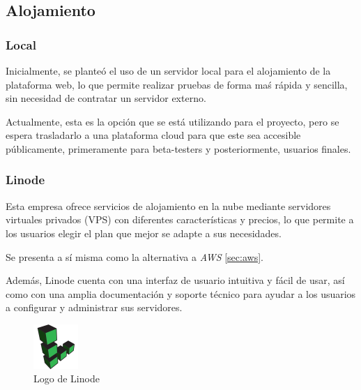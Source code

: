         \subsection{Alojamiento}

            \subsubsection{Local}

                Inicialmente, se planteó el uso de un servidor local para el alojamiento de la plataforma web, lo que permite realizar pruebas de forma maś rápida y sencilla, sin necesidad de contratar un servidor externo.

                Actualmente, esta es la opción que se está utilizando para el proyecto, pero se espera trasladarlo a una plataforma cloud para que este sea accesible públicamente, primeramente para beta-testers y posteriormente, usuarios finales.
                
            \subsubsection{Linode}

                Esta empresa ofrece servicios de alojamiento en la nube mediante servidores virtuales privados (VPS) con diferentes características y precios, lo que permite a los usuarios elegir el plan que mejor se adapte a sus necesidades.

                Se presenta a sí misma como la alternativa a \textit{AWS} \ref{sec:aws}.

                Además, Linode cuenta con una interfaz de usuario intuitiva y fácil de usar, así como con una amplia documentación y soporte técnico para ayudar a los usuarios a configurar y administrar sus servidores.

                \begin{figure}[htbp]
                    \centering

                    \includegraphics[width=0.15\textwidth]{images/Logos/linode.png}
                    \caption{Logo de Linode}

                    \label{fig:linode-logo}
                \end{figure}

